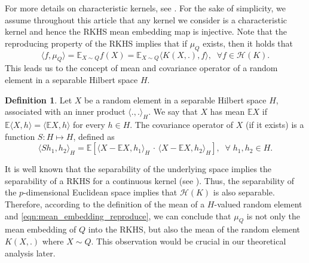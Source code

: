 \documentclass[11pt]{article}
\newcommand{\bE}{\mathbb{E}}
\theoremstyle{plain}
\theoremstyle{definition}
\newtheorem{definition}[theorem]{Definition}
\theoremstyle{remark}
\begin{document}
For more details on characteristic kernels, see \cite{fukumizu2007kernel,sriperumbudur2008injective,sriperumbudur2010hilbert}. For the sake of simplicity, we assume throughout this article that any kernel we consider is a characteristic kernel and hence the RKHS mean embedding map is injective.  
Note that the reproducing property of the RKHS implies that if $\mu_Q$ exists, then it holds that
\begin{equation}\label{eqn:mean_embedding_reproduce}
    \langle f, \mu_Q\rangle=\bE_{X \sim Q} f(X)=\bE_{X \sim Q} \langle K(X,.),f\rangle,\;\;\forall f \in \mathcal{H}(K).
\end{equation}
This leads us to the concept of mean and covariance operator of a random element in a separable Hilbert space $H$.
\begin{definition}\label{defn:mean_cov_Hilbert_space}
    Let $X$ be a random element in a separable Hilbert space $H$, associated with an inner product $\langle .,. \rangle _{H}$. We say that $X$ has mean $\bE X$ if $\bE \langle X, h \rangle=\langle \bE X, h\rangle$ for every $h \in H.$ The covariance operator of $X$ (if it exists) is a function $S:H\mapsto H$, defined as
    \begin{equation}
        \langle S h_1, h_2 \rangle_H= \bE\left[\langle X-\bE X, h_1\rangle_H \,\cdot\,\langle X-\bE X, h_2\rangle_H\right],\;\;\forall\;h_1,h_2\in H.
    \end{equation}   
\end{definition}
It is well known that the separability of the underlying space implies the separability of a RKHS for a continuous kernel (see \cite{berlinet2011reproducing}). Thus, the separability of the $p$-dimensional Euclidean space implies that $\mathcal{H}(K)$ is also separable. Therefore, according to the definition of the mean of a $H$-valued random element and \eqref{eqn:mean_embedding_reproduce}, we can conclude that $\mu_Q$ is not only the mean embedding of $Q$ into the RKHS, but also the mean of the random element $K(X,.)$ where $X\sim Q$. This observation would be crucial in our theoretical analysis later. 
\end{document}
